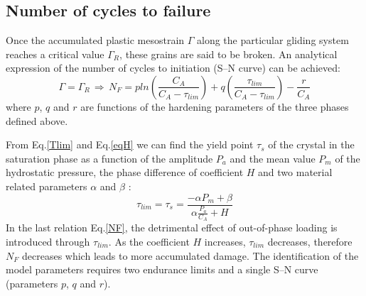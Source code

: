 \documentclass[3p,times,procedia,number]{elsarticle}
\begin{document}
\subsection{Number of cycles to failure}
Once the accumulated plastic mesostrain $\Gamma$ along the particular gliding
system reaches a critical value $\Gamma_R$, these grains are said
to be broken. An analytical expression of the number
of cycles to initiation (S–N curve) can be achieved:
\begin{equation}
\Gamma=\Gamma_R \, \Rightarrow \, N_F=pln\left(\frac{C_A}{C_A-\tau_{lim}}\right)+q\left(\frac{\tau_{lim}}{C_A-\tau_{lim}}\right)-\frac{r}{C_A}
\label{NF}
\end{equation}
where $p$, $q$ and $r$ are functions of the hardening parameters of the three phases defined above.

From Eq.\eqref{Tlim} and Eq.\eqref{eqH} we can find the yield point $\tau_s$ of the crystal in the saturation phase as a function of the amplitude $P_a$ and the mean value $P_m$ of the hydrostatic pressure, the phase difference of coefficient $H$ and two material related parameters $\alpha$ and $\beta$ :
\begin{equation}
\tau_{lim}=\tau_s=\frac{-\alpha P_m+\beta}{\alpha\frac{P_a}{C_A}+H}
\label{taus}
\end{equation}
In the last relation Eq.\eqref{NF}, the detrimental effect of out-of-phase loading is introduced through $\tau_{lim}$. As the coefficient $H$ increases, $\tau_{lim}$  decreases, therefore $N_F$ decreases which leads to more accumulated damage. The identification of the model parameters requires two endurance limits and a
single S–N curve (parameters $p$, $q$ and $r$).
\end{document}
